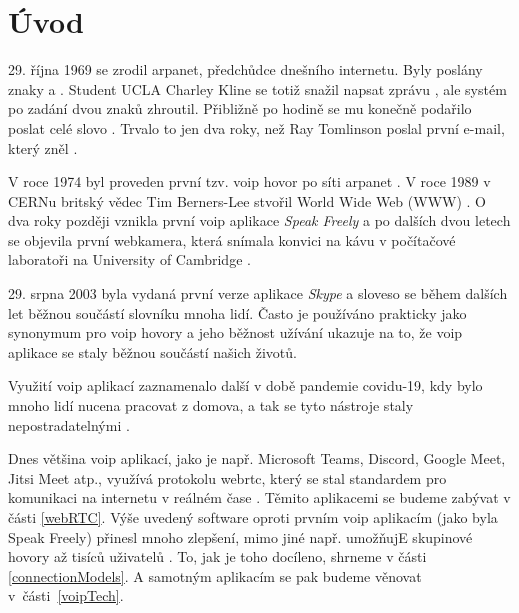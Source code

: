 \section{Úvod}

29. října 1969 se zrodil \gls{arpanet}, předchůdce dnešního internetu. Byly
poslány znaky  a . Student UCLA Charley Kline se totiž snažil napsat
zprávu , ale systém po zadání dvou znaků zhroutil. Přibližně po hodině
se mu konečně podařilo poslat celé slovo
\parencite{PBS-SimpleHelloFirstMessageOverARPANET}. Trvalo to jen dva roky, než
Ray Tomlinson poslal první e-mail, který zněl 
\parencite{YahooFinance-SimpleHelloFirstMessageOverARPANET}.

V roce 1974 byl proveden první tzv. \gls{voip} hovor po síti \gls{arpanet}
\parencite{DigiFone-WhatYouMightNotKnowAboutTheHistoryOfVoIP}. V roce 1989 v
CERNu britský vědec Tim Berners-Lee stvořil World Wide Web (WWW)
\parencite{CERN-TheBirthOfTheWeb}. O dva roky později vznikla první \gls{voip}
aplikace \textit{Speak Freely}
\parencite{DigiFone-WhatYouMightNotKnowAboutTheHistoryOfVoIP} a po dalších dvou
letech se objevila první webkamera, která snímala konvici na kávu v počítačové
laboratoři na University of Cambridge
\parencite{BBC-FirstWebcamMadeCoffeePotFamous}.

29. srpna 2003 byla vydaná první verze aplikace \textit{Skype}
\parencite{ArsTechnica-TheStrangeStoryOfSkype} a sloveso  se
během dalších let běžnou součástí slovníku mnoha lidí. Často je používáno
prakticky jako synonymum pro \gls{voip} hovory a jeho běžnost užívání ukazuje na
to, že \gls{voip} aplikace se staly běžnou součástí našich životů.

Využití \gls{voip} aplikací zaznamenalo další  v době pandemie
covidu-19, kdy bylo mnoho lidí nucena pracovat z domova, a tak se tyto nástroje
staly nepostradatelnými \parencite{OnSIP-VoIPStatsTrendsCovidImpact}.

Dnes většina \gls{voip} aplikací, jako je např. Microsoft Teams, Discord, Google
Meet, Jitsi Meet atp., využívá protokolu \gls{webrtc}, který se stal standardem
pro komunikaci na internetu v reálném čase
\parencite{LevelUp-WhatPowerMeetAndTeams,
    Discord-HowDoesItHandleMillionsOfUsers, Jitsi-Projects, WebRTCORG-Homepage}.
Těmito aplikacemi se budeme zabývat v části \ref{webRTC}. Výše uvedený software
oproti prvním \gls{voip} aplikacím (jako byla Speak Freely) přinesl mnoho
zlepšení, mimo jiné např. umožňujE skupinové hovory až tisíců uživatelů
\parencite{MicrosoftLearn-MSTeamsLimitsAndSpecs}. To, jak je toho docíleno,
shrneme v části \ref{connectionModels}. A samotným aplikacím se pak budeme
věnovat v~části~\ref{voipTech}.

